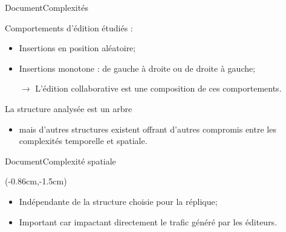 \begin{frame}{Document}{Complexités}

  \begin{minipage}{0.45\textwidth}
    \begin{center}
      
    \end{center}
  \end{minipage}
  \hfill
  \begin{minipage}{0.45\textwidth}
    \begin{center}
      
    \end{center}
  \end{minipage}

  \vspace{0.5cm}
  
  Comportements d'édition étudiés :
  \begin{itemize}
  \item Insertions en position aléatoire;
  \item Insertions monotone : de gauche à droite ou de droite à gauche;
  \item [$\rightarrow$] L'édition collaborative est une composition de ces
    comportements.
  \end{itemize}
  
  \vspace{0.5cm}
  
  La structure analysée est un arbre 
  \begin{itemize}
  \item mais d'autres structures existent offrant d'autres compromis entre les
    complexités temporelle et spatiale.
  \end{itemize}

\end{frame}

\begin{frame}{Document}{Complexité spatiale}
  \vspace{1cm}
  
  \begin{textblock*}{\textwidth}(-0.86cm,-1.5cm) 
    \begin{table}[H]
      
    \end{table}
  \end{textblock*}
  
  \vspace{2cm}
  
  \begin{itemize}
  \item Indépendante de la structure choisie pour la réplique;
    \vspace{0.5cm}
  \item Important car impactant directement le trafic généré par
    les éditeurs.
  \end{itemize}
  
\end{frame}


